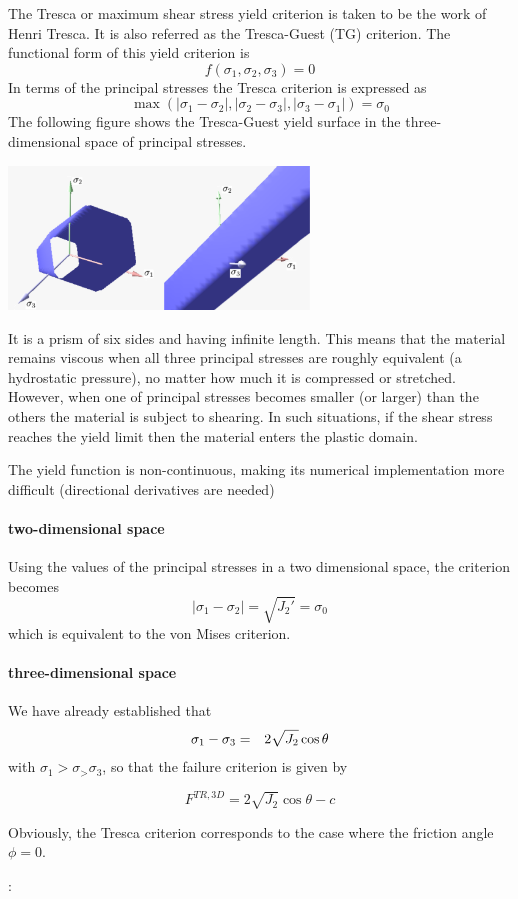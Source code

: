 The Tresca or maximum shear stress yield criterion is taken to be the work of Henri Tresca. It is also referred as the Tresca-Guest (TG) criterion. The functional form of this yield criterion is
\[
f(\sigma_1,\sigma_2,\sigma_3) = 0
\]
In terms of the principal stresses the Tresca criterion is expressed as
\[
{\max(|\sigma_1 - \sigma_2| , |\sigma_2 - \sigma_3| , |\sigma_3 - \sigma_1| ) = \sigma_0 }
\]
The following figure shows the Tresca-Guest yield surface in the three-dimensional space of principal stresses. 
\begin{center}
\includegraphics[width=0.6\textwidth]{images/rheology/tresca/Tresca.pdf}
\end{center}
It is a prism of six sides and having infinite length. This means that the material remains viscous when all three principal stresses are roughly equivalent (a hydrostatic pressure), no matter how much it is compressed or stretched. However, when one of principal stresses becomes smaller (or larger) than the others the material is subject to shearing. In such situations, if the shear stress reaches the yield limit then the material enters the plastic domain. 

\begin{remark}
The yield function is non-continuous, making its numerical implementation more difficult (directional derivatives are needed)
\end{remark}

\paragraph{two-dimensional space}
Using the values of the principal stresses in a two dimensional space, the criterion becomes 
\[
|\sigma_1 - \sigma_2| =\sqrt{J_2'}  = \sigma_0 
\]
which is equivalent to the von Mises criterion.


\paragraph{three-dimensional space}
We have already established that 
\begin{eqnarray}
\sigma_1 - \sigma_3  &=& 2 \sqrt{J_2} \cos \theta \nonumber
\end{eqnarray}
with $\sigma_1>\sigma_>\sigma_3$,
so that the failure criterion is given by

\begin{mdframed}[backgroundcolor=blue!5]
\[
F^{TR,3D}=2\sqrt{J_2}\cos \theta - c 
\]
\end{mdframed}

Obviously, the Tresca criterion corresponds to the case where the friction angle $\phi=0$.


\Literature: \cite{long03}
